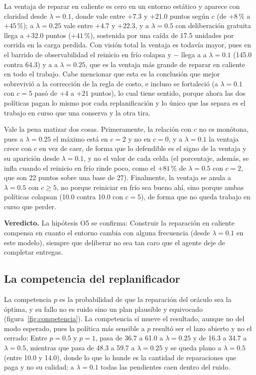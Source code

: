 La ventaja de reparar en caliente es cero en un entorno estático y aparece con claridad desde $\lambda=0.1$, donde vale entre $+7.3$ y $+21.0$ puntos según $c$ (de $+8$\,\% a $+45$\,\%); a $\lambda=0.25$ vale entre $+4.7$ y $+22.3$, y a $\lambda=0.5$ con deliberación gratuita llega a $+32.0$ puntos ($+41$\,\%), sostenida por una caída de 17.5 unidades por corrida en la carga perdida. Con visión total la ventaja es todavía mayor, pues en el barrido de observabilidad el reinicio en frío colapsa y \CL$-$\CR{} llega a  a $\lambda=0.1$ (145.0 contra 64.3) y a  a $\lambda=0.25$, que es la ventaja más grande de reparar en caliente en todo el trabajo. Cabe mencionar que esta es la conclusión que mejor sobrevivió a la corrección de la regla de costo, e incluso se fortaleció (a $\lambda=0.1$ con $c=5$ pasó de $+4$ a $+21$ puntos), lo cual tiene sentido, porque ahora las dos políticas pagan lo mismo por cada replanificación y lo único que las separa es el trabajo en curso que una conserva y la otra tira.

Vale la pena matizar dos cosas. Primeramente, la relación con $c$ no es monótona, pues a $\lambda=0.25$ el máximo está en $c=2$ y no en $c=0$, y a $\lambda=0.1$ la ventaja crece con $c$ en vez de caer, de forma que lo defendible es el signo de la ventaja y su aparición desde $\lambda=0.1$, y no el valor de cada celda (el porcentaje, además, se infla cuando el reinicio en frío rinde poco, como el $+81$\,\% de $\lambda=0.5$ con $c=2$, que son 22 puntos sobre una base de 27). Finalmente, la ventaja se anula a $\lambda=0.5$ con $c\ge5$, no porque reiniciar en frío sea bueno ahí, sino porque ambas políticas colapsan (10.0 contra 10.0 con $c=5$), de forma que no queda trabajo en curso que perder.

\textbf{Veredicto.} La hipótesis O5 se confirma: Construir la reparación en caliente compensa en cuanto el entorno cambia con alguna frecuencia (desde $\lambda=0.1$ en este modelo), siempre que deliberar no sea tan caro que el agente deje de completar entregas.

\FloatBarrier
\subsection{La competencia del replanificador}\label{sec:res-competencia}

La competencia $p$ es la probabilidad de que la reparación del oráculo sea la óptima, y su fallo no es ruido sino un plan plausible y equivocado (figura~\ref{fig:competencia}). La competencia sí mueve el resultado, aunque no del modo esperado, pues la política más sensible a $p$ resultó ser el lazo abierto y no el cerrado: Entre $p=0.5$ y $p=1$, \OL{} pasa de 36.7 a 61.0 a $\lambda=0.25$ y de 16.3 a 34.7 a $\lambda=0.5$, mientras que \CL{} pasa de 48.3 a 59.7 a $\lambda=0.25$ y se queda plano a $\lambda=0.5$ (entre 10.0 y 14.0), donde lo que lo hunde es la cantidad de reparaciones que paga y no su calidad; a $\lambda=0.1$ todas las pendientes caen dentro del ruido.

